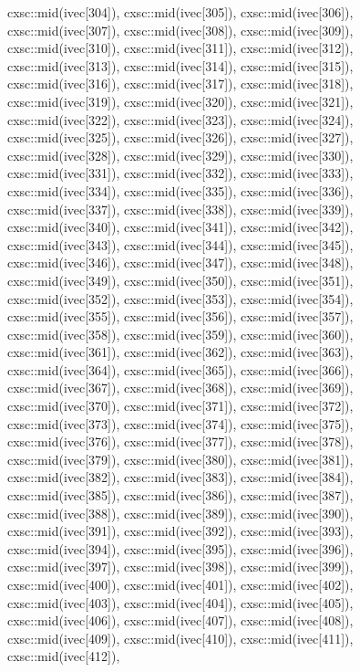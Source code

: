 \begin{DoxyCode}
{  cxsc::mid(ivec[304]),
  cxsc::mid(ivec[305]),
  cxsc::mid(ivec[306]),
  cxsc::mid(ivec[307]),
  cxsc::mid(ivec[308]),
  cxsc::mid(ivec[309]),
  cxsc::mid(ivec[310]),
  cxsc::mid(ivec[311]),
  cxsc::mid(ivec[312]),
  cxsc::mid(ivec[313]),
  cxsc::mid(ivec[314]),
  cxsc::mid(ivec[315]),
  cxsc::mid(ivec[316]),
  cxsc::mid(ivec[317]),
  cxsc::mid(ivec[318]),
  cxsc::mid(ivec[319]),
  cxsc::mid(ivec[320]),
  cxsc::mid(ivec[321]),
  cxsc::mid(ivec[322]),
  cxsc::mid(ivec[323]),
  cxsc::mid(ivec[324]),
  cxsc::mid(ivec[325]),
  cxsc::mid(ivec[326]),
  cxsc::mid(ivec[327]),
  cxsc::mid(ivec[328]),
  cxsc::mid(ivec[329]),
  cxsc::mid(ivec[330]),
  cxsc::mid(ivec[331]),
  cxsc::mid(ivec[332]),
  cxsc::mid(ivec[333]),
  cxsc::mid(ivec[334]),
  cxsc::mid(ivec[335]),
  cxsc::mid(ivec[336]),
  cxsc::mid(ivec[337]),
  cxsc::mid(ivec[338]),
  cxsc::mid(ivec[339]),
  cxsc::mid(ivec[340]),
  cxsc::mid(ivec[341]),
  cxsc::mid(ivec[342]),
  cxsc::mid(ivec[343]),
  cxsc::mid(ivec[344]),
  cxsc::mid(ivec[345]),
  cxsc::mid(ivec[346]),
  cxsc::mid(ivec[347]),
  cxsc::mid(ivec[348]),
  cxsc::mid(ivec[349]),
  cxsc::mid(ivec[350]),
  cxsc::mid(ivec[351]),
  cxsc::mid(ivec[352]),
  cxsc::mid(ivec[353]),
  cxsc::mid(ivec[354]),
  cxsc::mid(ivec[355]),
  cxsc::mid(ivec[356]),
  cxsc::mid(ivec[357]),
  cxsc::mid(ivec[358]),
  cxsc::mid(ivec[359]),
  cxsc::mid(ivec[360]),
  cxsc::mid(ivec[361]),
  cxsc::mid(ivec[362]),
  cxsc::mid(ivec[363]),
  cxsc::mid(ivec[364]),
  cxsc::mid(ivec[365]),
  cxsc::mid(ivec[366]),
  cxsc::mid(ivec[367]),
  cxsc::mid(ivec[368]),
  cxsc::mid(ivec[369]),
  cxsc::mid(ivec[370]),
  cxsc::mid(ivec[371]),
  cxsc::mid(ivec[372]),
  cxsc::mid(ivec[373]),
  cxsc::mid(ivec[374]),
  cxsc::mid(ivec[375]),
  cxsc::mid(ivec[376]),
  cxsc::mid(ivec[377]),
  cxsc::mid(ivec[378]),
  cxsc::mid(ivec[379]),
  cxsc::mid(ivec[380]),
  cxsc::mid(ivec[381]),
  cxsc::mid(ivec[382]),
  cxsc::mid(ivec[383]),
  cxsc::mid(ivec[384]),
  cxsc::mid(ivec[385]),
  cxsc::mid(ivec[386]),
  cxsc::mid(ivec[387]),
  cxsc::mid(ivec[388]),
  cxsc::mid(ivec[389]),
  cxsc::mid(ivec[390]),
  cxsc::mid(ivec[391]),
  cxsc::mid(ivec[392]),
  cxsc::mid(ivec[393]),
  cxsc::mid(ivec[394]),
  cxsc::mid(ivec[395]),
  cxsc::mid(ivec[396]),
  cxsc::mid(ivec[397]),
  cxsc::mid(ivec[398]),
  cxsc::mid(ivec[399]),
  cxsc::mid(ivec[400]),
  cxsc::mid(ivec[401]),
  cxsc::mid(ivec[402]),
  cxsc::mid(ivec[403]),
  cxsc::mid(ivec[404]),
  cxsc::mid(ivec[405]),
  cxsc::mid(ivec[406]),
  cxsc::mid(ivec[407]),
  cxsc::mid(ivec[408]),
  cxsc::mid(ivec[409]),
  cxsc::mid(ivec[410]),
  cxsc::mid(ivec[411]),
  cxsc::mid(ivec[412]),
}
\end{DoxyCode}
